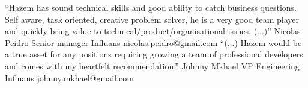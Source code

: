 %
%
%

\twocolumnsection
{
        {“Hazem has sound technical skills and good ability to catch business questions. Self aware, task oriented, creative problem solver, he is a very good team player and quickly bring value to technical/product/organisational issues. (...)”}
        {Nicolas Peidro}
        {Senior manager}
	    {Influans}
	    {nicolas.peidro@gmail.com}
}
{
        {“(...) Hazem would be a true asset for any positions requiring growing a team of professional developers and comes with my heartfelt recommendation.”}  
        {Johnny Mkhael}
    	{VP Engineering}
        {Influans}
    	{johnny.mkhael@gmail.com}
}